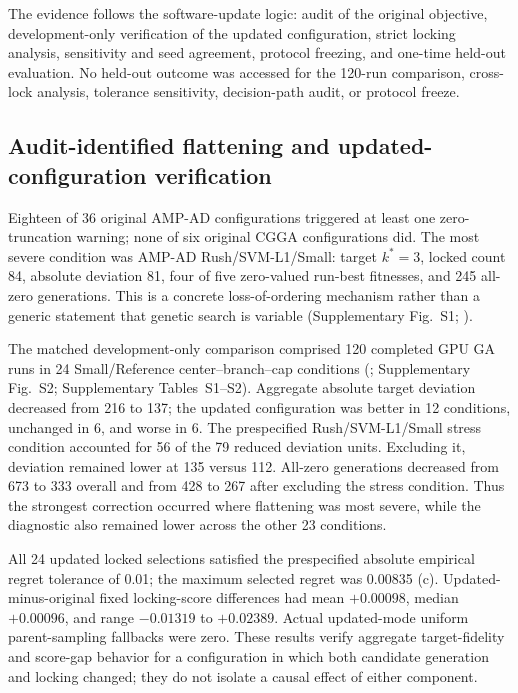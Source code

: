The evidence follows the software-update logic: audit of the original objective, development-only verification of the updated configuration, strict locking analysis, sensitivity and seed agreement, protocol freezing, and one-time held-out evaluation. No held-out outcome was accessed for the 120-run comparison, cross-lock analysis, tolerance sensitivity, decision-path audit, or protocol freeze.

\subsection{Audit-identified flattening and updated-configuration verification}

Eighteen of 36 original AMP-AD configurations triggered at least one zero-truncation warning; none of six original CGGA configurations did. The most severe condition was AMP-AD Rush/SVM-L1/Small: target \(k^*=3\), locked count 84, absolute deviation 81, four of five zero-valued run-best fitnesses, and 245 all-zero generations. This is a concrete loss-of-ordering mechanism rather than a generic statement that genetic search is variable (Supplementary Fig.~S1; ).



The matched development-only comparison comprised 120 completed GPU GA runs in 24 Small/Reference center--branch--cap conditions (; Supplementary Fig.~S2; Supplementary Tables~S1--S2). Aggregate absolute target deviation decreased from 216 to 137; the updated configuration was better in 12 conditions, unchanged in 6, and worse in 6. The prespecified Rush/SVM-L1/Small stress condition accounted for 56 of the 79 reduced deviation units. Excluding it, deviation remained lower at 135 versus 112. All-zero generations decreased from 673 to 333 overall and from 428 to 267 after excluding the stress condition. Thus the strongest correction occurred where flattening was most severe, while the diagnostic also remained lower across the other 23 conditions.

All 24 updated locked selections satisfied the prespecified absolute empirical regret tolerance of 0.01; the maximum selected regret was 0.00835 (c). Updated-minus-original fixed locking-score differences had mean \(+0.00098\), median \(+0.00096\), and range \(-0.01319\) to \(+0.02389\). Actual updated-mode uniform parent-sampling fallbacks were zero. These results verify aggregate target-fidelity and score-gap behavior for a configuration in which both candidate generation and locking changed; they do not isolate a causal effect of either component.

